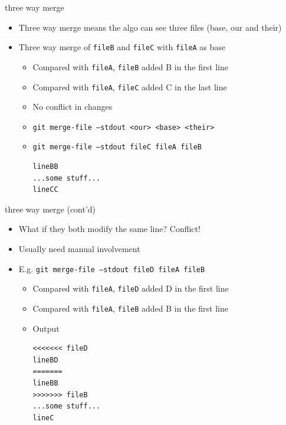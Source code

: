 \documentclass[aspectratio=169]{beamer}
\newcommand{\T}[1]{\texttt{#1}}
\begin{document}
\begin{frame}[fragile]{three way merge}
  \begin{itemize}
    \item Three way merge means the algo can see three files (base, our and their)
    \item Three way merge of \T{fileB} and \T{fileC} with \T{fileA} as base\begin{itemize}
      \item Compared with \T{fileA}, \T{fileB} added B in the first line
      \item Compared with \T{fileA}, \T{fileC} added C in the last line
      \item No conflict in changes
      \item \T{git merge-file --stdout <our> <base> <their>}
      \item \T{git merge-file --stdout fileC fileA fileB}\begin{verbatim}
lineBB
...some stuff...
lineCC
\end{verbatim}
    \end{itemize}
  \end{itemize}
\end{frame}

\begin{frame}[fragile]{three way merge (cont'd)}
  \begin{itemize}
    \item What if they both modify the same line? Conflict!
    \item Usually need manual involvement
    \item E.g. \T{git merge-file --stdout fileD fileA fileB}\begin{itemize}
      \item Compared with \T{fileA}, \T{fileD} added D in the first line
      \item Compared with \T{fileA}, \T{fileB} added B in the first line
      \item Output\begin{verbatim}
<<<<<<< fileD
lineBD
=======
lineBB
>>>>>>> fileB
...some stuff...
lineC
\end{verbatim}
    \end{itemize}
  \end{itemize}
\end{frame}
\end{document}
